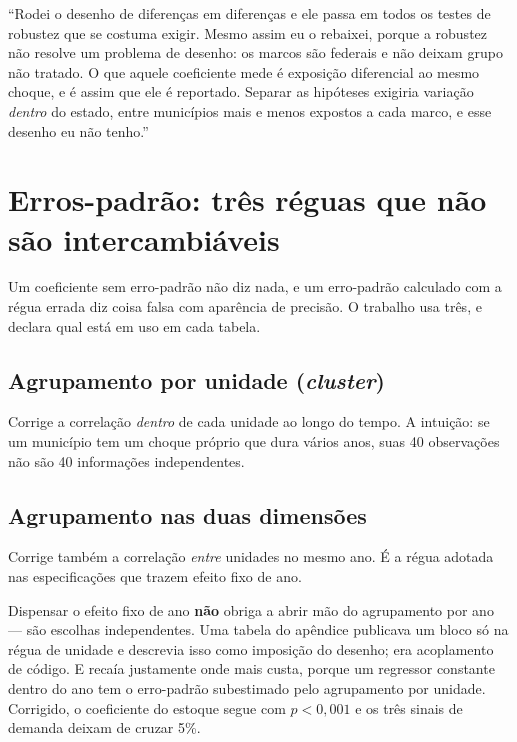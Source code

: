 \begin{nabanca}
``Rodei o desenho de diferenças em diferenças e ele passa em todos os testes de
robustez que se costuma exigir. Mesmo assim eu o rebaixei, porque a robustez não
resolve um problema de desenho: os marcos são federais e não deixam grupo não
tratado. O que aquele coeficiente mede é exposição diferencial ao mesmo choque,
e é assim que ele é reportado. Separar as hipóteses exigiria variação
\emph{dentro} do estado, entre municípios mais e menos expostos a cada marco, e
esse desenho eu não tenho.''
\end{nabanca}

\chapter{Erros-padrão: três réguas que não são intercambiáveis}
\label{cap:erros}

Um coeficiente sem erro-padrão não diz nada, e um erro-padrão calculado com a
régua errada diz coisa falsa com aparência de precisão. O trabalho usa três, e
declara qual está em uso em cada tabela.

\section{Agrupamento por unidade (\emph{cluster})}

Corrige a correlação \emph{dentro} de cada unidade ao longo do tempo. A
intuição: se um município tem um choque próprio que dura vários anos, suas 40
observações não são 40 informações independentes.

\section{Agrupamento nas duas dimensões}

Corrige também a correlação \emph{entre} unidades no mesmo ano. É a régua
adotada nas especificações que trazem efeito fixo de ano.

\begin{armadilha}
Dispensar o efeito fixo de ano \textbf{não} obriga a abrir mão do agrupamento
por ano --- são escolhas independentes. Uma tabela do apêndice publicava um
bloco só na régua de unidade e descrevia isso como imposição do desenho; era
acoplamento de código. E recaía justamente onde mais custa, porque um regressor
constante dentro do ano tem o erro-padrão subestimado pelo agrupamento por
unidade. Corrigido, o coeficiente do estoque segue com $p<0{,}001$ e os três
sinais de demanda deixam de cruzar 5\%.
\end{armadilha}


